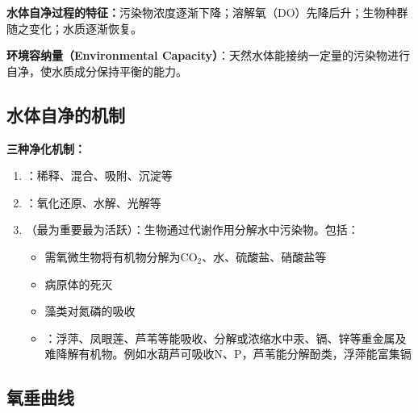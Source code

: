 \documentclass[10pt,a4paper,oneside]{ctexbook}
\begin{document}
\textbf{水体自净过程的特征：}污染物浓度逐渐下降；溶解氧（DO）先降后升；生物种群随之变化；水质逐渐恢复。

\textbf{环境容纳量（Environmental Capacity）}：天然水体能接纳一定量的污染物进行自净，使水质成分保持平衡的能力。

\subsection{水体自净的机制}

\begin{keybox}
\textbf{三种净化机制：}

\begin{enumerate}[leftmargin=*]
    \item {}：稀释、混合、吸附、沉淀等
    \item {}：氧化还原、水解、光解等
    \item {}（最为重要最为活跃）：生物通过代谢作用分解水中污染物。包括：
    \begin{itemize}
        \item 需氧微生物将有机物分解为CO$_2$、水、硫酸盐、硝酸盐等
        \item 病原体的死灭
        \item 藻类对氮磷的吸收
        \item {}：浮萍、凤眼莲、芦苇等能吸收、分解或浓缩水中汞、镉、锌等重金属及难降解有机物。例如水葫芦可吸收N、P，芦苇能分解酚类，浮萍能富集镉
    \end{itemize}
\end{enumerate}
\end{keybox}

\subsection{氧垂曲线}
\end{document}

